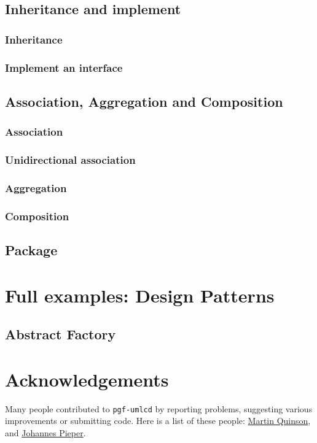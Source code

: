 \documentclass{article}
\newcommand{\demo}[2][1]{
\begin{minipage}{.49\linewidth}
\centering
\resizebox{#1\linewidth}{!}{

}
\end{minipage}
\hspace{0.01\linewidth}
\begin{minipage}{.5\linewidth}

\end{minipage}
}
\newcommand{\example}[1]{
\resizebox{\linewidth}{!}{

}

}
\begin{document}
\subsection{Inheritance and implement}
\subsubsection{Inheritance}
\demo{inheritance}
 
\subsubsection{Implement an interface}
\demo{implement-interface}

\subsection{Association, Aggregation and Composition}
\subsubsection{Association} 
\demo{association}
 
\subsubsection{Unidirectional association}
\demo{unidirectional-association}

\subsubsection{Aggregation}
\demo{aggregation}

\subsubsection{Composition}
\demo{composition}

\subsection{Package}
\demo{package}

\section{Full examples: Design Patterns}
\subsection{Abstract Factory}
\example{abstract-factory}

\section{Acknowledgements}
Many people contributed to \texttt{pgf-umlcd} by reporting problems,
suggesting various improvements or submitting code. Here is a list of
these people: \href{mailto:martin.quinson@loria.fr}{Martin Quinson},
and \href{mailto:johannes_pieper@yahoo.de}{Johannes Pieper}.
\end{document}
